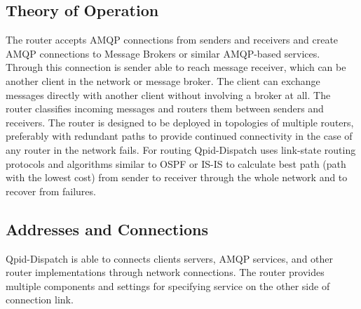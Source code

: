 \subsection{Theory of Operation}
The router accepts AMQP connections from senders and receivers and create AMQP connections to Message Brokers or similar AMQP-based services. Through this connection is sender able to reach message receiver, which can be another client in the network or message broker. The client can exchange messages directly with another client without involving a broker at all. The router classifies incoming messages and routers them between senders and receivers. The router is designed to be deployed in topologies of multiple routers, preferably with redundant paths to provide continued connectivity in the case of any router in the network fails. For routing Qpid-Dispatch uses link-state routing protocols\footnotemark{} and algorithms similar to OSPF or IS-IS to calculate best path (path with the lowest cost) from sender to receiver through the whole network and to recover from failures.


\subsection{Addresses and Connections}
\label{Addresses and Connections}
Qpid-Dispatch is able to connects clients servers, AMQP services, and other router implementations through network connections. The router provides multiple components and settings for specifying service on the other side of connection link.

